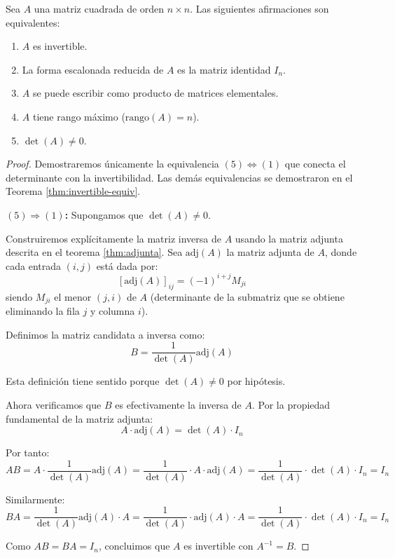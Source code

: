 \begin{theorem}\label{thm:invertible-equiv-v2}
Sea $A$ una matriz cuadrada de orden $n \times n$. Las siguientes afirmaciones son equivalentes:
\begin{enumerate}
    \item $A$ es invertible.
    \item La forma escalonada reducida de $A$ es la matriz identidad $I_n$.
    \item $A$ se puede escribir como producto de matrices elementales.
    \item $A$ tiene rango máximo ($\text{rango}(A) = n$).
    \item $\det(A) \neq 0$.
\end{enumerate}

\begin{proof}
Demostraremos únicamente la equivalencia $(5) \Leftrightarrow (1)$ que conecta el determinante con la invertibilidad. Las demás equivalencias se demostraron en el Teorema \ref{thm:invertible-equiv}.

\textbf{$(5) \Rightarrow (1)$:} Supongamos que $\det(A) \neq 0$.

Construiremos explícitamente la matriz inversa de $A$ usando la matriz adjunta descrita en el teorema \ref{thm:adjunta}. Sea $\text{adj}(A)$ la matriz adjunta de $A$, donde cada entrada $(i,j)$ está dada por:
\[[\text{adj}(A)]_{ij} = (-1)^{i+j} M_{ji}\]
siendo $M_{ji}$ el menor $(j,i)$ de $A$ (determinante de la submatriz que se obtiene eliminando la fila $j$ y columna $i$).

Definimos la matriz candidata a inversa como:
\[B = \frac{1}{\det(A)} \text{adj}(A)\]

Esta definición tiene sentido porque $\det(A) \neq 0$ por hipótesis.

Ahora verificamos que $B$ es efectivamente la inversa de $A$. Por la propiedad fundamental de la matriz adjunta:
\[A \cdot \text{adj}(A) = \det(A) \cdot I_n\]

Por tanto:
\[AB = A \cdot \frac{1}{\det(A)} \text{adj}(A) = \frac{1}{\det(A)} \cdot A \cdot \text{adj}(A) = \frac{1}{\det(A)} \cdot \det(A) \cdot I_n = I_n\]

Similarmente:
\[BA = \frac{1}{\det(A)} \text{adj}(A) \cdot A = \frac{1}{\det(A)} \cdot \text{adj}(A) \cdot A = \frac{1}{\det(A)} \cdot \det(A) \cdot I_n = I_n\]

Como $AB = BA = I_n$, concluimos que $A$ es invertible con $A^{-1} = B$.


\end{proof}
\end{theorem}
